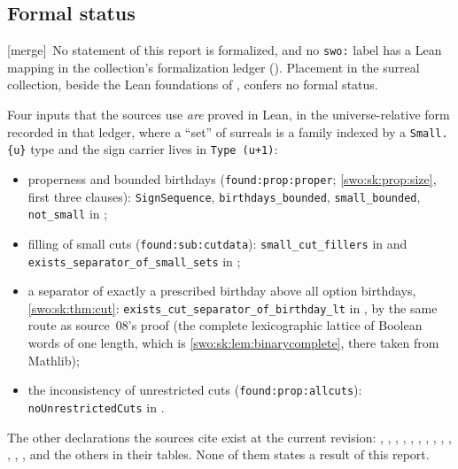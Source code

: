 \documentclass[11pt]{article}
\theoremstyle{definition}
\theoremstyle{remark}
\newcommand{\code}[1]{\texttt{\small #1}}
\newcommand{\merge}{\textsf{[merge]}}
\begin{document}
\subsection{Formal status}\label{swo:sec:formal}

\merge\ No statement of this report is formalized, and no \code{swo:} label
has a Lean mapping in the collection's formalization ledger
(). Placement in the
surreal collection, beside the Lean foundations of
, confers no formal status.

Four inputs that the sources use \emph{are} proved in Lean, in the
universe-relative form recorded in that ledger, where a ``set'' of surreals is
a family indexed by a \code{Small.\{u\}} type and the sign carrier lives in
\code{Type (u+1)}:
\begin{itemize}
\item properness and bounded birthdays (\code{found:prop:proper};
\cref{swo:sk:prop:size}, first three clauses): \code{SignSequence},
\code{birthdays\_bounded}, \code{small\_bounded}, \code{not\_small} in
;
\item filling of small cuts (\code{found:sub:cutdata}):
\code{small\_cut\_fillers} in  and
\code{exists\_separator\_of\_small\_sets} in
;
\item a separator of exactly a prescribed birthday above all option
birthdays, \cref{swo:sk:thm:cut}: \code{exists\_cut\_separator\_of\_birthday\_lt}
in , by the same route as source~08's proof
(the complete lexicographic lattice of Boolean words of one length, which is
\cref{swo:sk:lem:binarycomplete}, there taken from Mathlib);
\item the inconsistency of unrestricted cuts (\code{found:prop:allcuts}):
\code{noUnrestrictedCuts} in .
\end{itemize}
The other declarations the sources cite exist at the current revision:
, ,
, ,
, , ,
, , ,
, ,
, and the others in their tables. None of them states a result
of this report.
\end{document}

